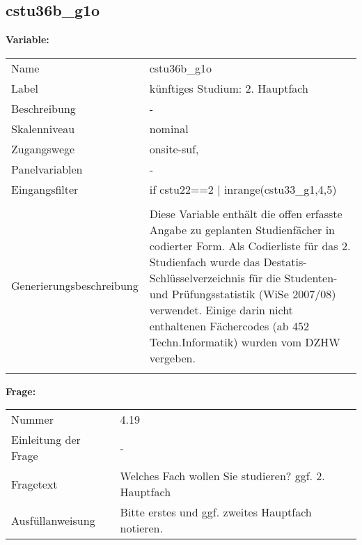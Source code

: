 	
	
	\subsection{cstu36b\_g1o}
	\label{subSection:cstu36b_g1o}

	\noindent\textbf{Variable:}\\
		\begin{tabular}{lL{11.3cm}}
			\label{tableVariable:cstu36b_g1o}
			Name & cstu36b\_g1o \\
			Label & künftiges Studium: 2. Hauptfach \\
			Beschreibung & - \\
			Skalenniveau & nominal \\
			Zugangswege &
				onsite-suf,
 \\
			Panelvariablen & -
			 \\
			Eingangsfilter & if cstu22==2 | inrange(cstu33\_g1,4,5) \\
 \\
					Generierungsbeschreibung & Diese Variable enthält die offen erfasste Angabe zu geplanten Studienfächer in codierter Form.  Als Codierliste für das 2. Studienfach wurde das Destatis-Schlüsselverzeichnis für die Studenten- und Prüfungsstatistik (WiSe 2007/08) verwendet. Einige darin nicht enthaltenen Fächercodes (ab 452 Techn.Informatik) wurden vom DZHW vergeben.
				 \\	
			 \\
		\end{tabular}

		\vspace*{1 cm}
		\noindent\textbf{Frage:}\\
		\begin{tabular}{lL{11.3cm}}
			\label{tableQuestion:cstu36b_g1o}
			Nummer & 4.19 \\
			Einleitung der Frage & - \\
			Fragetext & Welches Fach wollen Sie studieren?
ggf. 2. Hauptfach \\
			Ausfüllanweisung & Bitte erstes und ggf. zweites Hauptfach notieren. \\
		\end{tabular}





